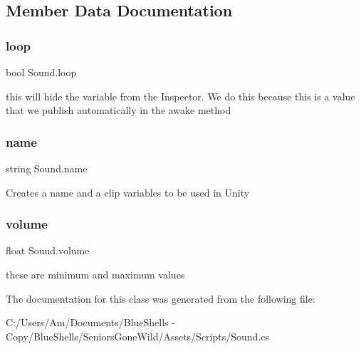 \subsection{Member Data Documentation}
\mbox{\label{class_sound_a24f0da6a226712e28b3159aa9ebb4be5}} 
\subsubsection{\texorpdfstring{loop}{loop}}
{\footnotesize\ttfamily bool Sound.\+loop}



this will hide the variable from the Inspector. We do this because this is a value that we publish automatically in the awake method 

\mbox{\label{class_sound_a6232daa7d1f983315cc0d10cf776ab76}} 
\subsubsection{\texorpdfstring{name}{name}}
{\footnotesize\ttfamily string Sound.\+name}



Creates a name and a clip variables to be used in Unity 

\mbox{\label{class_sound_a7ab1335f27bd340c389568889823cc00}} 
\subsubsection{\texorpdfstring{volume}{volume}}
{\footnotesize\ttfamily float Sound.\+volume}



these are minimum and maximum values 



The documentation for this class was generated from the following file\+:\begin{DoxyCompactItemize}
\item 
C\+:/\+Users/\+Am/\+Documents/\+Blue\+Shells -\/ Copy/\+Blue\+Shells/\+Seniors\+Gone\+Wild/\+Assets/\+Scripts/Sound.\+cs\end{DoxyCompactItemize}
